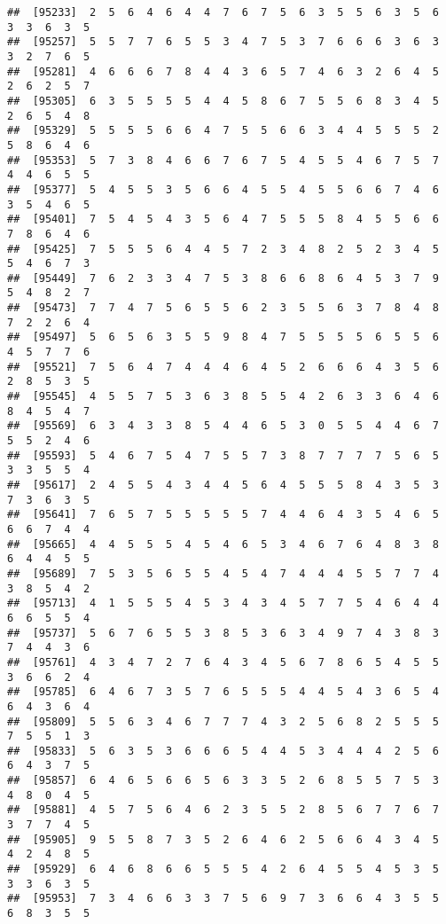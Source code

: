 \documentclass[
]{book}
\begin{document}
\begin{verbatim}
##  [95233]  2  5  6  4  6  4  4  7  6  7  5  6  3  5  5  6  3  5  6  3  3  6  3  5
##  [95257]  5  5  7  7  6  5  5  3  4  7  5  3  7  6  6  6  3  6  3  3  2  7  6  5
##  [95281]  4  6  6  6  7  8  4  4  3  6  5  7  4  6  3  2  6  4  5  2  6  2  5  7
##  [95305]  6  3  5  5  5  5  4  4  5  8  6  7  5  5  6  8  3  4  5  2  6  5  4  8
##  [95329]  5  5  5  5  6  6  4  7  5  5  6  6  3  4  4  5  5  5  2  5  8  6  4  6
##  [95353]  5  7  3  8  4  6  6  7  6  7  5  4  5  5  4  6  7  5  7  4  4  6  5  5
##  [95377]  5  4  5  5  3  5  6  6  4  5  5  4  5  5  6  6  7  4  6  3  5  4  6  5
##  [95401]  7  5  4  5  4  3  5  6  4  7  5  5  5  8  4  5  5  6  6  7  8  6  4  6
##  [95425]  7  5  5  5  6  4  4  5  7  2  3  4  8  2  5  2  3  4  5  5  4  6  7  3
##  [95449]  7  6  2  3  3  4  7  5  3  8  6  6  8  6  4  5  3  7  9  5  4  8  2  7
##  [95473]  7  7  4  7  5  6  5  5  6  2  3  5  5  6  3  7  8  4  8  7  2  2  6  4
##  [95497]  5  6  5  6  3  5  5  9  8  4  7  5  5  5  5  6  5  5  6  4  5  7  7  6
##  [95521]  7  5  6  4  7  4  4  4  6  4  5  2  6  6  6  4  3  5  6  2  8  5  3  5
##  [95545]  4  5  5  7  5  3  6  3  8  5  5  4  2  6  3  3  6  4  6  8  4  5  4  7
##  [95569]  6  3  4  3  3  8  5  4  4  6  5  3  0  5  5  4  4  6  7  5  5  2  4  6
##  [95593]  5  4  6  7  5  4  7  5  5  7  3  8  7  7  7  7  5  6  5  3  3  5  5  4
##  [95617]  2  4  5  5  4  3  4  4  5  6  4  5  5  5  8  4  3  5  3  7  3  6  3  5
##  [95641]  7  6  5  7  5  5  5  5  5  7  4  4  6  4  3  5  4  6  5  6  6  7  4  4
##  [95665]  4  4  5  5  5  4  5  4  6  5  3  4  6  7  6  4  8  3  8  6  4  4  5  5
##  [95689]  7  5  3  5  6  5  5  4  5  4  7  4  4  4  5  5  7  7  4  3  8  5  4  2
##  [95713]  4  1  5  5  5  4  5  3  4  3  4  5  7  7  5  4  6  4  4  6  6  5  5  4
##  [95737]  5  6  7  6  5  5  3  8  5  3  6  3  4  9  7  4  3  8  3  7  4  4  3  6
##  [95761]  4  3  4  7  2  7  6  4  3  4  5  6  7  8  6  5  4  5  5  3  6  6  2  4
##  [95785]  6  4  6  7  3  5  7  6  5  5  5  4  4  5  4  3  6  5  4  6  4  3  6  4
##  [95809]  5  5  6  3  4  6  7  7  7  4  3  2  5  6  8  2  5  5  5  7  5  5  1  3
##  [95833]  5  6  3  5  3  6  6  6  5  4  4  5  3  4  4  4  2  5  6  6  4  3  7  5
##  [95857]  6  4  6  5  6  6  5  6  3  3  5  2  6  8  5  5  7  5  3  4  8  0  4  5
##  [95881]  4  5  7  5  6  4  6  2  3  5  5  2  8  5  6  7  7  6  7  3  7  7  4  5
##  [95905]  9  5  5  8  7  3  5  2  6  4  6  2  5  6  6  4  3  4  5  4  2  4  8  5
##  [95929]  6  4  6  8  6  6  5  5  5  4  2  6  4  5  5  4  5  3  5  3  3  6  3  5
##  [95953]  7  3  4  6  6  3  3  7  5  6  9  7  3  6  6  4  3  5  5  6  8  3  5  5

\end{verbatim}
\end{document}
